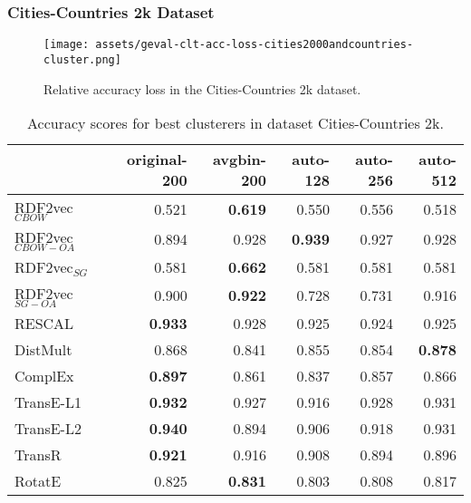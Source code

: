 \documentclass[11pt,titlepage,oneside,openany]{book}
\begin{document}
\newpage

\subsubsection{Cities-Countries 2k Dataset}
\label{subsubsec:geval-results-clt-cities2000andcountries-cluster}


\begin{figure}[H]
    \centering
    \texttt{[image: assets/geval-clt-acc-loss-cities2000andcountries-cluster.png]}
    \vspace*{-3mm}
    \caption{Relative accuracy loss in the Cities-Countries 2k dataset.}
    \label{fig:geval-clt-acc-loss-cities2000andcountries-cluster}
\end{figure}


\begin{table}[H]
\centering
\begin{tabular}{lrrrrr}
\toprule
{} &  original-200 &  avgbin-200 &  auto-128 &  auto-256 &  auto-512 \\
\midrule
RDF2vec$_{CBOW}$     &         0.521  &	\textbf{0.619} &     0.550  &     0.556  &     0.518  \\
RDF2vec$_{CBOW-OA}$  &         0.894  &       0.928  &	\textbf{0.939} &     0.927  &     0.928  \\
RDF2vec$_{SG}$       &         0.581  &	\textbf{0.662} &     0.581  &     0.581  &     0.581  \\
RDF2vec$_{SG-OA}$    &         0.900  &	\textbf{0.922} &     0.728  &     0.731  &     0.916  \\
RESCAL               &	\textbf{0.933} &       0.928  &     0.925  &     0.924  &     0.925  \\
DistMult             &         0.868  &       0.841  &     0.855  &     0.854  &	\textbf{0.878} \\
ComplEx              &	\textbf{0.897} &       0.861  &     0.837  &     0.857  &     0.866  \\
TransE-L1            &	\textbf{0.932} &       0.927  &     0.916  &     0.928  &     0.931  \\
TransE-L2            &	\textbf{0.940} &       0.894  &     0.906  &     0.918  &     0.931  \\
TransR               &	\textbf{0.921} &       0.916  &     0.908  &     0.894  &     0.896  \\
RotatE               &         0.825  &	\textbf{0.831} &     0.803  &     0.808  &     0.817  \\
\bottomrule
\end{tabular}
\caption{Accuracy scores for best clusterers in dataset Cities-Countries 2k.}
\label{tab:geval-clt-acc-cities2000andcountries-cluster}
\end{table}
\end{document}

